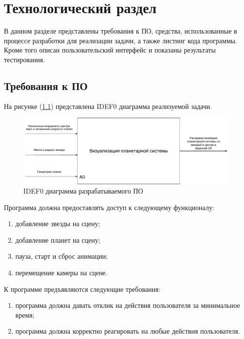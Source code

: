 \chapter{Технологический раздел}
\label{cha:technological}

    В данном разделе представлены требования к ПО, средства, использованные в процессе разработки для реализации задачи, а также листинг кода программы. Кроме того описан пользовательский интерфейс и показаны результаты тестирования.

    \section{Требования к ПО}
    \par На рисунке (\ref{schema:idef}) представлена IDEF0 диаграмма реализуемой задачи.
    \begin{figure}[h!]
            \centering
            \includegraphics[scale=0.6]{inc/idef.pdf}
            \caption{IDEF0 диаграмма разрабатываемого ПО}
            \label{schema:idef}
        \end{figure}\clearpage
    \par Программа должна предоставлять доступ к следующему функционалу:
    \begin{enumerate}
            \item добавление звезды на сцену;
            \item добавление планет на сцену;
            \item пауза, старт и сброс анимации;
            \item перемещение камеры на сцене.
        \end{enumerate}
    \par К программе предъявляются следующие требования:
    \begin{enumerate}
            \item программа должна давать отклик на действия пользователя за минимальное время;
            \item программа должна корректно реагировать на любые действия пользователя.
        \end{enumerate}

